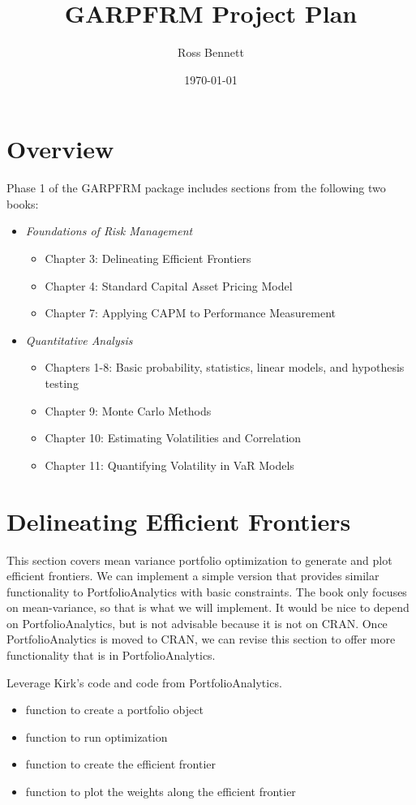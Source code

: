 \documentclass[12pt]{amsart}
\title{GARPFRM Project Plan}
\author{Ross Bennett}
\date{\today} %
\begin{document}
\maketitle
\tableofcontents

\section{Overview}
Phase 1 of the GARPFRM package includes sections from the following two books:
\begin{itemize}
\item \textit{Foundations of Risk Management}
\begin{itemize}
\item Chapter 3: Delineating Efficient Frontiers
\item Chapter 4: Standard Capital Asset Pricing Model
\item Chapter 7: Applying CAPM to Performance Measurement
\end{itemize}
\item \textit{Quantitative Analysis}
\begin{itemize}
\item Chapters 1-8: Basic probability, statistics, linear models, and hypothesis testing
\item Chapter 9: Monte Carlo Methods
\item Chapter 10: Estimating Volatilities and Correlation
\item Chapter 11: Quantifying Volatility in VaR Models
\end{itemize}
\end{itemize}

\section{Delineating Efficient Frontiers}
This section covers mean variance portfolio optimization to generate and plot efficient frontiers. We can implement a simple version that provides similar functionality to PortfolioAnalytics with basic constraints. The book only focuses on mean-variance, so that is what we will implement. It would be nice to depend on PortfolioAnalytics, but is not advisable because it is not on CRAN. Once PortfolioAnalytics is moved to CRAN, we can revise this section to offer more functionality that is in PortfolioAnalytics.

Leverage Kirk's code and code from PortfolioAnalytics.
\begin{itemize}
\item function to create a portfolio object
\item function to run optimization
\item function to create the efficient frontier
\item function to plot the weights along the efficient frontier
\end{itemize}
\end{document}
